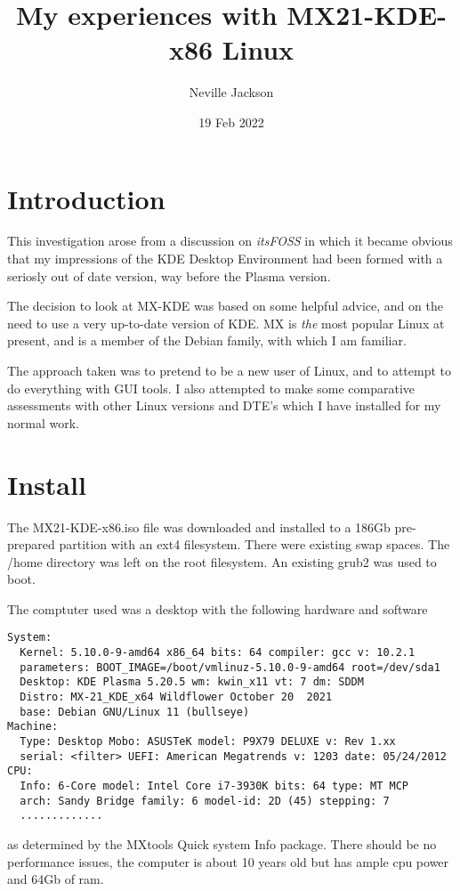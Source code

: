 \documentclass{article}  %
\title{My experiences with MX21-KDE-x86 Linux}
\author{Neville Jackson}
\date{19 Feb 2022}
\begin{document}
 

\maketitle      

\section{Introduction} 
This investigation arose from a discussion on {\em itsFOSS} in which it became obvious that my impressions of the KDE Desktop Environment had been formed with a seriosly out of date version, way before the Plasma version. 

The decision to look at MX-KDE was based on some helpful advice, and on the need to use a very up-to-date version of KDE. MX is {\em the} most popular Linux at present, and is a member of the Debian family, with which I am familiar.

The approach taken was to pretend to be a new user of Linux, and to attempt to do everything with GUI tools. 
I also attempted to make some comparative assessments with other Linux versions and DTE's which I have installed for my normal work.

\section{Install}
\label{sec:install}
The MX21-KDE-x86.iso file was downloaded and installed to a 186Gb pre-prepared partition with an ext4 filesystem. There were existing swap spaces. The /home directory was left on the root filesystem. An existing grub2 was used to boot.

The comptuter used  was a desktop with the following hardware and software
\begin{verbatim}
System:
  Kernel: 5.10.0-9-amd64 x86_64 bits: 64 compiler: gcc v: 10.2.1 
  parameters: BOOT_IMAGE=/boot/vmlinuz-5.10.0-9-amd64 root=/dev/sda1 
  Desktop: KDE Plasma 5.20.5 wm: kwin_x11 vt: 7 dm: SDDM 
  Distro: MX-21_KDE_x64 Wildflower October 20  2021 
  base: Debian GNU/Linux 11 (bullseye) 
Machine:
  Type: Desktop Mobo: ASUSTeK model: P9X79 DELUXE v: Rev 1.xx 
  serial: <filter> UEFI: American Megatrends v: 1203 date: 05/24/2012 
CPU:
  Info: 6-Core model: Intel Core i7-3930K bits: 64 type: MT MCP 
  arch: Sandy Bridge family: 6 model-id: 2D (45) stepping: 7 
  .............
\end{verbatim}
as determined by the MXtools Quick system Info package. 
There should be no performance issues, the computer is about 10 years old but has ample cpu power and 64Gb of ram.
\end{document}
